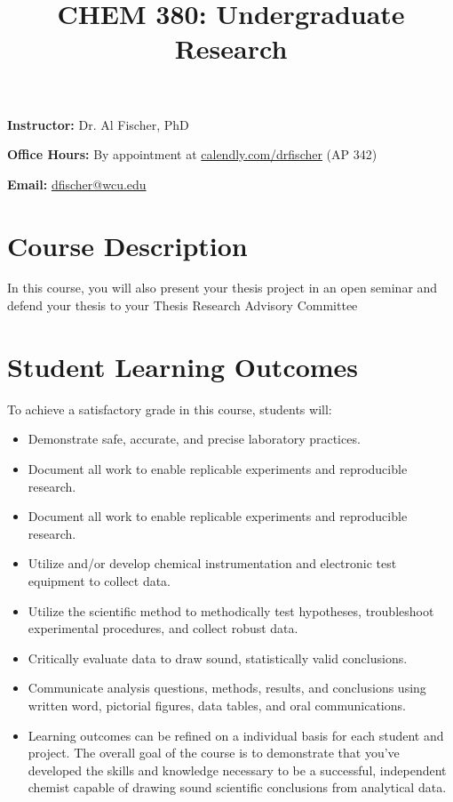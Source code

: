 \documentclass[11pt]{article}
\date{}
\title{CHEM 380: Undergraduate Research}
\begin{document}
\maketitle
\textbf{Instructor:} Dr. Al Fischer, PhD 

\textbf{Office Hours:} By appointment at \href{http://www.calendly.com/drfischer}{calendly.com/drfischer} (AP 342)  

\textbf{Email:} \href{mailto:dfischer@wcu.edu}{dfischer@wcu.edu}

\section{Course Description}
\label{sec:org4cc8720}


In this course, you will also present your thesis project in an open seminar and defend your thesis to your Thesis Research Advisory Committee

\section{Student Learning Outcomes}
\label{sec:org8fc3c4e}

To achieve a satisfactory grade in this course, students will:

\begin{itemize}
\item Demonstrate safe, accurate, and precise laboratory practices.
\item Document all work to enable replicable experiments and reproducible research.
\item Document all work to enable replicable experiments and reproducible research.
\item Utilize and/or develop chemical instrumentation and electronic test equipment to collect data.
\item Utilize the scientific method to methodically test hypotheses, troubleshoot experimental procedures, and collect robust data.
\item Critically evaluate data to draw sound, statistically valid conclusions.
\item Communicate analysis questions, methods, results, and conclusions using written word, pictorial figures, data tables, and oral communications.
\item Learning outcomes can be refined on a individual basis for each student and project. The overall goal of the course is to demonstrate that you’ve developed the skills and knowledge necessary to be a successful, independent chemist capable of drawing sound scientific conclusions from analytical data.
\end{itemize}
\end{document}
